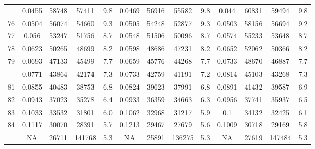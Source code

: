 \documentclass[
  14pt,
]{article}
\begin{document}
\begin{longtable}[t]{lcccccccccccc}
\addlinespace
75 & 0.0455 & 58748 & 57411 & 9.8 & 0.0469 & 56916 & 55582 & 9.8 & 0.044 & 60831 & 59494 & 9.8\\
76 & 0.0504 & 56074 & 54660 & 9.3 & 0.0505 & 54248 & 52877 & 9.3 & 0.0503 & 58156 & 56694 & 9.2\\
77 & 0.056 & 53247 & 51756 & 8.7 & 0.0548 & 51506 & 50096 & 8.7 & 0.0574 & 55233 & 53648 & 8.7\\
78 & 0.0623 & 50265 & 48699 & 8.2 & 0.0598 & 48686 & 47231 & 8.2 & 0.0652 & 52062 & 50366 & 8.2\\
79 & 0.0693 & 47133 & 45499 & 7.7 & 0.0659 & 45776 & 44268 & 7.7 & 0.0733 & 48670 & 46887 & 7.7\\
\addlinespace
80 & 0.0771 & 43864 & 42174 & 7.3 & 0.0733 & 42759 & 41191 & 7.2 & 0.0814 & 45103 & 43268 & 7.3\\
81 & 0.0855 & 40483 & 38753 & 6.8 & 0.0824 & 39623 & 37991 & 6.8 & 0.0891 & 41432 & 39587 & 6.9\\
82 & 0.0943 & 37023 & 35278 & 6.4 & 0.0933 & 36359 & 34663 & 6.3 & 0.0956 & 37741 & 35937 & 6.5\\
83 & 0.1033 & 33532 & 31801 & 6.0 & 0.1062 & 32968 & 31217 & 5.9 & 0.1 & 34132 & 32425 & 6.1\\
84 & 0.1117 & 30070 & 28391 & 5.7 & 0.1213 & 29467 & 27679 & 5.6 & 0.1009 & 30718 & 29169 & 5.8\\
\addlinespace
85 & NA & 26711 & 141768 & 5.3 & NA & 25891 & 136275 & 5.3 & NA & 27619 & 147484 & 5.3\\*
\end{longtable}
\end{document}
